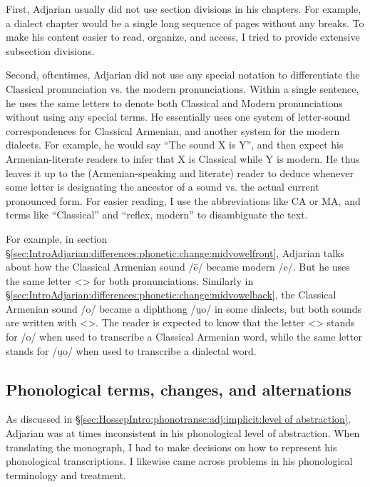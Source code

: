 \documentclass[output=paper]{langscibook}
\begin{document}
First, Adjarian usually did not use section divisions in his  chapters. For example, a dialect chapter would be a single long sequence of pages without any breaks.  To make his content easier to read, organize, and access, I tried to provide extensive subsection divisions. 

Second,  oftentimes, Adjarian did not use any special notation to differentiate the Classical pronunciation vs. the modern pronunciations.  Within a single sentence, he uses the same letters to denote both Classical and Modern pronunciations without using any special terms.  He essentially uses one system of letter-sound correspondences for Classical Armenian, and another system for the modern dialects. For example, he would say  ``The sound X is Y'', and then expect his Armenian\hyp literate readers to  infer that X is Classical while Y is modern. He thus leaves it up to the (Armenian\hyp speaking and literate) reader to deduce whenever some letter is designating the ancestor of a sound vs. the actual current pronounced form. For easier reading, I use the abbreviations like CA or MA, and terms like ``Classical'' and ``reflex, modern'' to disambiguate the text.

For example, in section \S\ref{sec:IntroAdjarian:differences:phonetic:change:midvowelfront}, Adjarian talks about how the Classical Armenian sound /ē/ became modern /e/. But he uses the same letter <> for both pronunciations. Similarly in \S\ref{sec:IntroAdjarian:differences:phonetic:change:midvowelback}, the Classical Armenian sound /o/ became a diphthong /u̯o/ in some dialects, but both sounds are written with <>. The reader is expected to know that the letter <> stands for /o/ when used to transcribe a Classical Armenian word, while the same letter stands for /u̯o/ when used to transcribe a dialectal word. 

 
\subsection{Phonological terms, changes, and  alternations}\label{sec:HossepIntro:translation:phono}
 

As discussed in \S\ref{sec:HossepIntro:phonotransc:adj:implicit:level of abstraction}, Adjarian was at times inconsistent in his phonological level of abstraction. When translating the monograph, I had to make decisions on how to represent his phonological transcriptions. I likewise came across problems in his phonological terminology and treatment.
\end{document}
